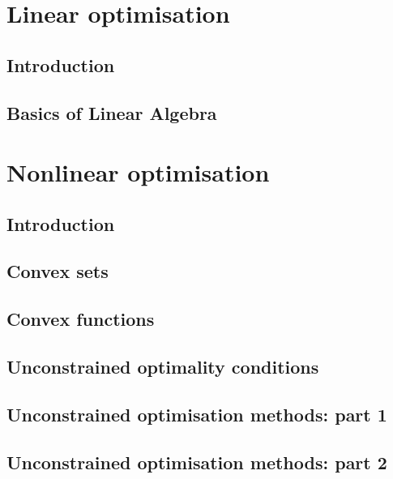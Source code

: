 \documentclass{bookest}
\begin{document}
	

	\tableofcontents
	
	\part{Linear optimisation}
	
	\chapter{Introduction}
	
	
	\chapter{Basics of Linear Algebra}
	
		
	
	\part{Nonlinear optimisation}
		
	\chapter{Introduction}
	
	
	\chapter{Convex sets}
	
	
	\chapter{Convex functions}
	
	
	\chapter{Unconstrained optimality conditions}
	
	
	\chapter{Unconstrained optimisation methods: part 1}
	
	
	\chapter{Unconstrained optimisation methods: part 2}
	
	
\end{document}
